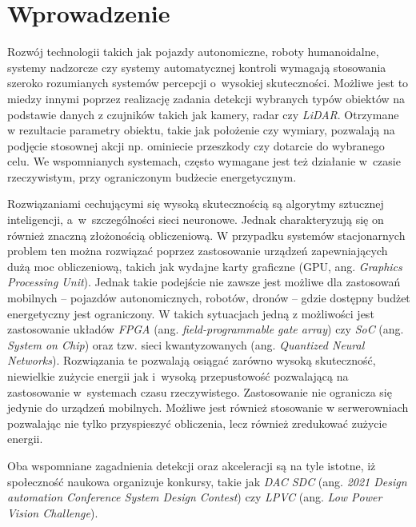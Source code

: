 \chapter{Wprowadzenie}
\label{cha:wprowadzenie}

Rozwój technologii takich jak pojazdy autonomiczne, roboty humanoidalne, systemy nadzorcze czy systemy automatycznej kontroli wymagają stosowania szeroko rozumianych systemów percepcji o~wysokiej skuteczności.
Możliwe jest to miedzy innymi poprzez realizację zadania detekcji wybranych typów obiektów na podstawie danych z czujników  takich jak kamery, radar czy \emph{LiDAR}.
Otrzymane w rezultacie parametry obiektu, takie jak położenie czy wymiary, pozwalają na podjęcie stosownej akcji np. ominiecie przeszkody czy dotarcie do wybranego celu.
We wspomnianych systemach, często wymagane jest też działanie w~czasie rzeczywistym, przy ograniczonym budżecie energetycznym. 

Rozwiązaniami cechującymi się wysoką skutecznością są algorytmy sztucznej inteligencji, a~w~szczególności sieci neuronowe.
Jednak charakteryzują się on również znaczną złożonością obliczeniową.
W przypadku systemów stacjonarnych problem ten można rozwiązać poprzez zastosowanie urządzeń zapewniających dużą moc obliczeniową, takich jak wydajne karty graficzne (GPU, ang. \emph{Graphics Processing Unit}).
Jednak takie podejście nie zawsze jest możliwe dla zastosowań mobilnych -- pojazdów autonomicznych, robotów, dronów -- gdzie dostępny budżet energetyczny jest ograniczony.
W takich sytuacjach jedną z możliwości jest zastosowanie układów \emph{FPGA} (ang. \emph{field-programmable gate array}) czy \emph{SoC} (ang. \emph{System on Chip})
oraz tzw. sieci kwantyzowanych (ang. \emph{Quantized Neural Networks}).
Rozwiązania te pozwalają osiągać zarówno wysoką skuteczność, niewielkie zużycie energii jak i~wysoką przepustowość pozwalającą na zastosowanie w~systemach czasu rzeczywistego.
Zastosowanie nie ogranicza się jedynie do urządzeń mobilnych. 
Możliwe jest również stosowanie w serwerowniach pozwalając nie tylko przyspieszyć obliczenia, lecz również zredukować zużycie energii.  

Oba wspomniane zagadnienia detekcji oraz akceleracji są na tyle istotne, iż społeczność naukowa organizuje konkursy, takie jak \emph{DAC SDC} (ang. \emph{ 2021 Design automation Conference System Design Contest}) czy \emph{LPVC} (ang. \emph{Low Power Vision Challenge}).
 


